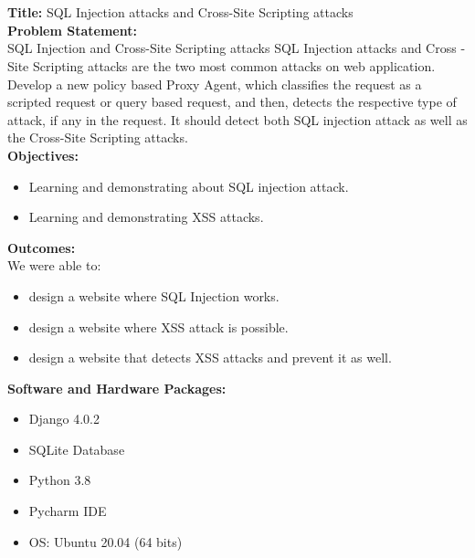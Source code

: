 \documentclass[a4paper, 12pt, fleqn]{article}
\begin{document}
\newpage

\section*{}
\textbf{Title:} SQL Injection attacks and Cross-Site Scripting attacks \\

\noindent
\textbf{Problem Statement:} \\
SQL Injection and Cross-Site Scripting attacks 
SQL Injection attacks and Cross -Site Scripting attacks
are the two most common attacks on web application. Develop a new policy
based Proxy Agent, which classifies the request as a scripted request or query
based request, and then, detects the respective type of attack, if any in the
request. It should detect both SQL injection attack as well as the Cross-Site
Scripting attacks. \\

\noindent
\textbf{Objectives:}
\begin{itemize}
	\item Learning and demonstrating about SQL injection attack.
	\item Learning and demonstrating XSS attacks. \\
\end{itemize}

\noindent
\textbf{Outcomes:} \\
We were able to:
\begin{itemize}
	\item design a website where SQL Injection works.
	\item design a website where XSS attack is possible.
	\item design a website that detects XSS attacks and prevent it as well. \\
\end{itemize}

\noindent
\textbf{Software and Hardware Packages:}
\begin{itemize}
	\item Django 4.0.2 
	\item SQLite Database
	\item Python 3.8
	\item Pycharm IDE
	\item OS: Ubuntu 20.04 (64 bits) \\
\end{itemize}

\newpage
\section*{}
\end{document}
